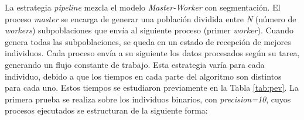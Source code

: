La estrategia \textit{pipeline} mezcla el modelo \textit{Master-Worker} con segmentación. El proceso \textit{master} se encarga de generar una población dividida entre \textit{N} (número de \textit{workers}) subpoblaciones que envía al siguiente proceso (primer \textit{worker}). Cuando genera todas las subpoblaciones, se queda en un estado de recepción de mejores individuos. Cada proceso envía a su siguiente los datos procesados según su tarea, generando un flujo constante de trabajo. Esta estrategia varía para cada individuo, debido a que los tiempos en cada parte del algoritmo son distintos para cada uno. Estos tiempos se estudiaron previamente en la Tabla \ref{tab:pev}. La primera prueba se realiza sobre los individuos binarios, con \textit{\textit{precision=10}}, cuyos procesos ejecutados se estructuran de la siguiente forma:

